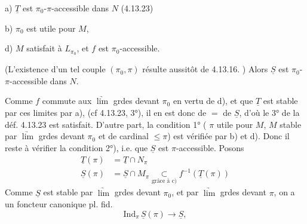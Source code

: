 a) $\underline T$ est $\pi_0$-$\pi$-accessible dans $N$ (4.13.23)

b) $\pi_0$ est utile pour $M$,  

d)  $M$ satisfait à $L_{\pi_0}$, et $f$ est $\pi_0$-accessible.


  (L'existence d'un tel couple $(\pi_0,\pi)$ résulte aussitôt de 4.13.16. ) Alors $\underline S$ est $\pi_0$-$\pi$-accessible dans $N$.

Comme $f$ commute aux $\underrightarrow{\lim}$ grdes devant $\pi_0$ en vertu de d), et que $\underline T$ est stable par ces limites par a), (cf 4.13.23, 3°), il en est donc de $=$ de $\underline S$, d'où le 3° de la déf. 4.13.23 est satisfait. D'autre part,  la condition 1° (  $\pi$ utile pour $M$, $M$ stable par $\underrightarrow{\lim}$ grdes devant $\pi_0$ et de cardinal $\leq\pi$) est vérifiée par b) et d). Donc il reste à vérifier la condition 2°), i.e. que $\underline S$ est $\pi$-accessible.    Posons
\[
\begin{aligned}
\underline T(\pi)&=\underline T\cap N_\pi\\
\underline S(\pi)&=\underline S\cap M_\pi\underset{\text{grâce à c)}}{\subset}f^{-1}(\underline T(\pi))
\end{aligned}
\]
 Comme $\underline S$ est stable  par $\underrightarrow{\lim}$ grdes devant $\pi_0$,  et  par $\underrightarrow{\lim}$ grdes devant $\pi$,  on a un foncteur canonique pl. fid.
\[
\mathrm{Ind}_{\pi}\,\underline S(\pi)\longrightarrow\underline S,
\]
